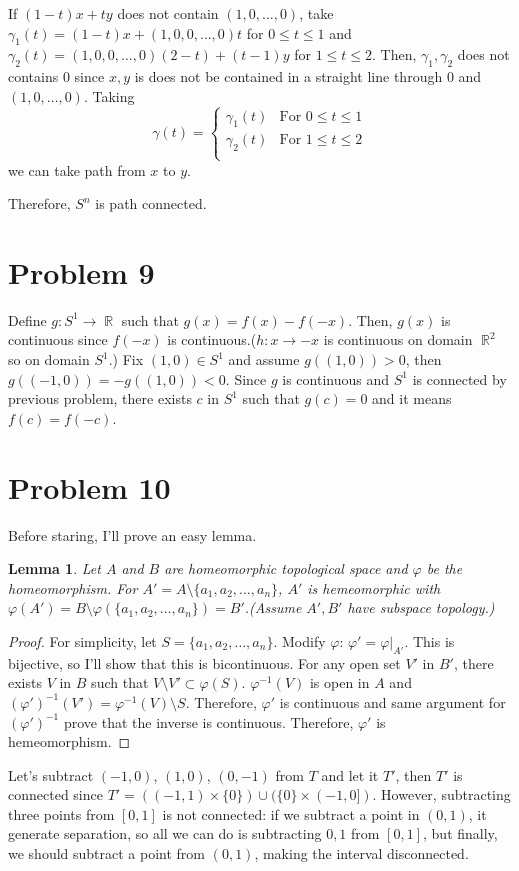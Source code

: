 \documentclass{article}
\DeclareMathOperator{\rr}{\mathbb{R}}
\newtheorem{lemma}{Lemma}
\begin{document}
If $(1-t)x+ty$ does not contain $(1, 0, \ldots, 0)$, take $\gamma_1(t)=(1-t)x+(1, 0, 0, \ldots, 0)t$ for $0\leq t \leq 1$ and $\gamma_2(t)=(1, 0, 0, \ldots, 0)(2-t)+(t-1)y$ for $1\leq t \leq 2$. Then, $\gamma_1,\gamma_2$ does not contains $0$ since $x,y$ is does not be contained in a straight line through $0$ and $(1,0, \ldots, 0)$. Taking \begin{equation*}
\gamma(t)=\begin{cases}
\gamma_1(t) & \text{For }0\leq t\leq 1 \\
\gamma_2(t) & \text{For }1\leq t\leq 2 \\
\end{cases}
\end{equation*}
we can take path from $x$ to $y$.

Therefore, $S^n$ is path connected.
\section*{Problem 9}
Define $g:S^1\rightarrow \rr$ such that $g(x)=f(x)-f(-x)$. Then, $g(x)$ is continuous since $f(-x)$ is continuous.($h:x\rightarrow -x$ is continuous on domain $\rr^2$ so on domain $S^1$.) Fix $(1,0)\in S^1$ and assume $g((1,0))>0$, then $g((-1, 0))=-g((1,0))<0$. Since $g$ is continuous and $S^1$ is connected by previous problem, there exists $c$ in $S^1$ such that $g(c)=0$ and it means $f(c)=f(-c)$.
\section*{Problem 10}
Before staring, I'll prove an easy lemma.
\begin{lemma}
Let $A$ and $B$ are homeomorphic topological space and $\varphi$ be the homeomorphism. For $A'=A\setminus\{a_1, a_2, \ldots, a_n\}$, $A'$ is hemeomorphic with $\varphi(A')=B\setminus\varphi(\{a_1, a_2, \ldots, a_n\})=B'$.(Assume $A',B'$ have subspace topology.)
\end{lemma}
\begin{proof}
For simplicity, let $S=\{a_1, a_2, \ldots, a_n\}$. Modify $\varphi$: $\varphi'=\varphi|_{A'}$. This is bijective, so I'll show that this is bicontinuous. For any open set $V'$ in $B'$, there exists $V$ in $B$ such that $V\setminus V'\subset \varphi(S)$. $\varphi^{-1}(V)$ is open in $A$ and $\left(\varphi'\right)^{-1}(V')=\varphi^{-1}(V)\setminus S$. Therefore, $\varphi'$ is continuous and same argument for $\left(\varphi'\right)^{-1}$ prove that the inverse is continuous. Therefore, $\varphi'$ is hemeomorphism.
\end{proof}
Let's subtract $(-1, 0)$, $(1, 0)$, $(0, -1)$ from $T$ and let it $T'$, then $T'$ is connected since $T'= ((-1,1)\times\{0\})\cup (\{0\}\times (-1,0])$. However, subtracting three points from $[0, 1]$ is not connected: if we subtract a point in $(0, 1)$, it generate separation, so all we can do is subtracting $0, 1$ from $[0, 1]$, but finally, we should subtract a point from $(0,1)$, making the interval disconnected.
\end{document}
